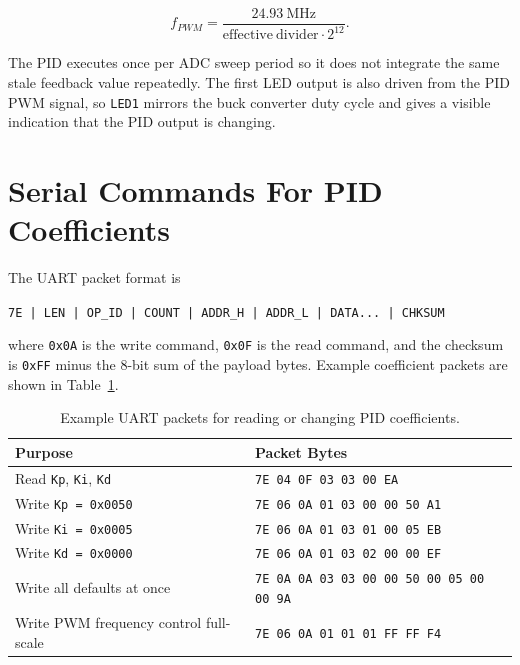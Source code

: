 \documentclass[12pt]{article}
\begin{document}
\begin{equation}
  f_{PWM} = \frac{24.93~\mathrm{MHz}}{\mathrm{effective\ divider} \cdot 2^{12}}.
\end{equation}

\noindent The PID executes once per ADC sweep period so it does not integrate the same stale feedback value repeatedly. The first LED output is also driven from the PID PWM signal, so \texttt{LED1} mirrors the buck converter duty cycle and gives a visible indication that the PID output is changing.

\section*{Serial Commands For PID Coefficients}

The UART packet format is

\begin{center}
\texttt{7E | LEN | OP\_ID | COUNT | ADDR\_H | ADDR\_L | DATA... | CHKSUM}
\end{center}

\noindent where \texttt{0x0A} is the write command, \texttt{0x0F} is the read command, and the checksum is \texttt{0xFF} minus the 8-bit sum of the payload bytes. Example coefficient packets are shown in Table~\ref{tab:packets}.

\begin{table}[H]
  \centering
  \caption{Example UART packets for reading or changing PID coefficients.}
  \label{tab:packets}
  \begin{tabular}{ll}
    \toprule
    Purpose & Packet Bytes \\
    \midrule
    Read \texttt{Kp}, \texttt{Ki}, \texttt{Kd} & \texttt{7E 04 0F 03 03 00 EA} \\
    Write \texttt{Kp = 0x0050} & \texttt{7E 06 0A 01 03 00 00 50 A1} \\
    Write \texttt{Ki = 0x0005} & \texttt{7E 06 0A 01 03 01 00 05 EB} \\
    Write \texttt{Kd = 0x0000} & \texttt{7E 06 0A 01 03 02 00 00 EF} \\
    Write all defaults at once & \texttt{7E 0A 0A 03 03 00 00 50 00 05 00 00 9A} \\
    Write PWM frequency control full-scale & \texttt{7E 06 0A 01 01 01 FF FF F4} \\
    \bottomrule
  \end{tabular}
\end{table}
\end{document}
